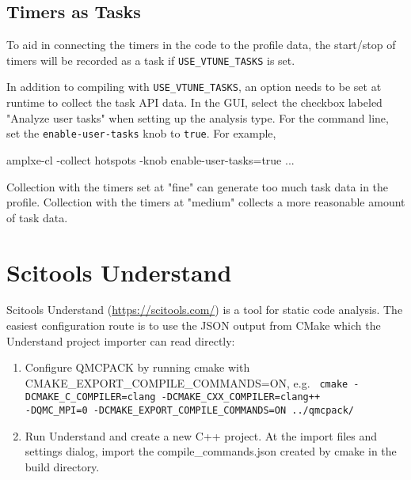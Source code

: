\subsection{Timers as Tasks}
To aid in connecting the timers in the code to the profile data, the start/stop of
timers will be recorded as a task if \texttt{USE\_VTUNE\_TASKS} is set.

In addition to compiling with \texttt{USE\_VTUNE\_TASKS}, an option needs to be set at runtime to collect the task API data.
In the GUI, select the checkbox labeled "Analyze user tasks" when setting up the analysis type.
For the command line, set the \texttt{enable-user-tasks} knob to \texttt{true}. For example,
\begin{shade}
amplxe-cl -collect hotspots -knob enable-user-tasks=true ...
\end{shade}

Collection with the timers set at "fine" can generate too much task data in the profile.
Collection with the timers at "medium" collects a more reasonable amount of task data.

\section{Scitools Understand}

Scitools Understand (\url{https://scitools.com/}) is a tool for static
code analysis. The easiest configuration route is to use the JSON output
from CMake which the Understand project importer can read directly:
\begin{enumerate}
\item Configure QMCPACK by running cmake with
  CMAKE\_EXPORT\_COMPILE\_COMMANDS=ON, e.g.
  \texttt{ cmake -DCMAKE\_C\_COMPILER=clang -DCMAKE\_CXX\_COMPILER=clang++ \\
    -DQMC\_MPI=0 -DCMAKE\_EXPORT\_COMPILE\_COMMANDS=ON ../qmcpack/ }
\item Run Understand and create a new C++ project. At the import files
  and settings dialog, import the compile\_commands.json created by
  cmake in the build directory.  
\end{enumerate}

